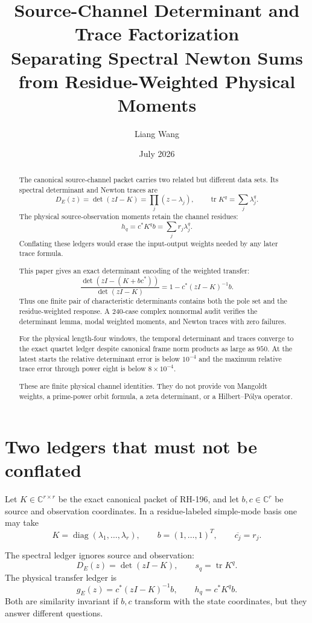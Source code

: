 \documentclass[12pt]{article}
\title{Source-Channel Determinant and Trace Factorization\\
\large Separating Spectral Newton Sums from Residue-Weighted Physical Moments}
\author{Liang Wang}
\date{July 2026}
\theoremstyle{remark}
\begin{document}
\maketitle

\begin{abstract}
The canonical source-channel packet carries two related but different data
sets.  Its spectral determinant and Newton traces are
\[
 D_E(z)=\det(zI-K)=\prod_j(z-\lambda_j),
 \qquad
 \operatorname{tr}K^q=\sum_j\lambda_j^q.
\]
The physical source-observation moments retain the channel residues:
\[
 h_q=c^*K^qb=\sum_jr_j\lambda_j^q.
\]
Conflating these ledgers would erase the input-output weights needed by any
later trace formula.

This paper gives an exact determinant encoding of the weighted transfer:
\[
 \frac{\det(zI-(K+bc^*))}{\det(zI-K)}
 =1-c^*(zI-K)^{-1}b.
\]
Thus one finite pair of characteristic determinants contains both the pole
set and the residue-weighted response.  A 240-case complex nonnormal audit
verifies the determinant lemma, modal weighted moments, and Newton traces
with zero failures.

For the physical length-four windows, the temporal determinant and traces
converge to the exact quartet ledger despite canonical frame norm products
as large as $950$.  At the latest starts the relative determinant error is
below $10^{-4}$ and the maximum relative trace error through power eight is
below $8\times10^{-4}$.

These are finite physical channel identities.  They do not provide
von Mangoldt weights, a prime-power orbit formula, a zeta determinant, or a
Hilbert--P\'olya operator.
\end{abstract}

\section{Two ledgers that must not be conflated}

Let $K\in\mathbb C^{r\times r}$ be the exact canonical packet of RH-196, and
let $b,c\in\mathbb C^r$ be source and observation coordinates.  In a
residue-labeled simple-mode basis one may take
\begin{equation}\label{eq:modal-data}
 K=\operatorname{diag}(\lambda_1,\ldots,\lambda_r),
 \qquad b=(1,\ldots,1)^T,
 \qquad \overline{c_j}=r_j.
\end{equation}

The spectral ledger ignores source and observation:
\begin{equation}\label{eq:spectral-ledger}
 D_E(z)=\det(zI-K),
 \qquad s_q=\operatorname{tr}K^q.
\end{equation}
The physical transfer ledger is
\begin{equation}\label{eq:transfer-ledger}
 g_E(z)=c^*(zI-K)^{-1}b,
 \qquad h_q=c^*K^qb.
\end{equation}
Both are similarity invariant if $b,c$ transform with the state coordinates,
but they answer different questions.
\end{document}

